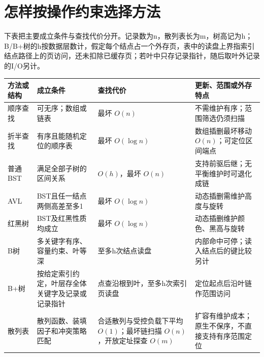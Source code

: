 \section{怎样按操作约束选择方法}\label{DS07-10}

下表把主要成立条件与查找代价分开。记录数为n，散列表长为m，树高记为h；B/B+树的h按数据层数计，假定每个结点占一个外存页，表中的读盘上界指索引结点路径上的页访问，还未扣除已缓存页；若叶中只存记录指针，随后取叶外记录的I/O另计。

\begin{wideblock}

\par\medskip\noindent\begin{minipage}{\linewidth}\fontsize{9.3}{12}\selectfont\begin{tabularx}{\linewidth}{@{}YYYY@{}}
\toprule\noalign{}
\begin{minipage}[b]{\linewidth}\raggedright
方法或结构
\end{minipage} & \begin{minipage}[b]{\linewidth}\raggedright
成立条件
\end{minipage} & \begin{minipage}[b]{\linewidth}\raggedright
查找代价
\end{minipage} & \begin{minipage}[b]{\linewidth}\raggedright
更新、范围或外存特点
\end{minipage} \\
\midrule\noalign{}


顺序查找 & 可无序；数组或链表 & 最坏 \(O(n)\) & 不需维护有序；范围筛选仍须扫描 \\
折半查找 & 有序且能随机定位的顺序表 & 最坏 \(O(\log n)\) & 数组插删最坏移动 \(O(n)\)；可定位区间端点 \\
普通BST & 满足全部子树的区间关系 & \(O(h)\)，最坏 \(O(n)\) & 支持前驱后继；无平衡维护时可退化成链 \\
AVL & BST且任一结点两侧高差至多1 & 最坏 \(O(\log n)\) & 动态插删需维护高度与旋转 \\
红黑树 & BST及红黑性质均成立 & 最坏 \(O(\log n)\) & 动态插删维护颜色、黑高与旋转 \\
B树 & 多关键字有序、容量约束、叶等深 & 至多h次结点读盘 & 内部命中可停；读入结点后的键比较另计 \\
B+树 & 按给定索引约定，叶层存全体关键字及记录或记录指针 & 点查沿根到叶，至多h次索引页读盘 & 定位起点后沿叶链作范围访问 \\
散列表 & 散列函数、装填因子和冲突策略匹配 & 合适散列与受控负载下平均 \(O(1)\)；最坏链扫描 \(O(n)\)，开放定址探查 \(O(m)\) & 扩容有维护成本；原生不保序，不直接支持有序范围定位 \\
\bottomrule\end{tabularx}
\end{minipage}\par\medskip

\end{wideblock}

